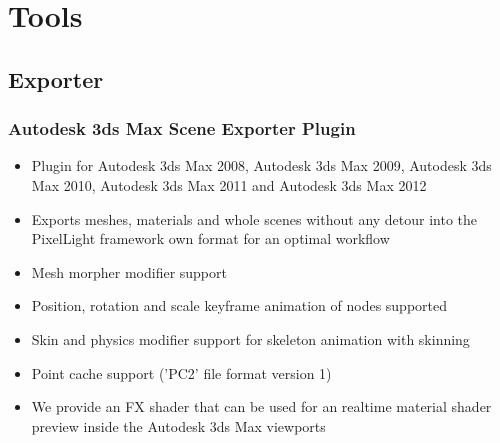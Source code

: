 \chapter{Tools}




\section{Exporter}


\subsection{Autodesk 3ds Max Scene Exporter Plugin}
\begin{itemize}
\item{Plugin for Autodesk 3ds Max 2008, Autodesk 3ds Max 2009, Autodesk 3ds Max 2010, Autodesk 3ds Max 2011 and Autodesk 3ds Max 2012}
\item{Exports meshes, materials and whole scenes without any detour into the PixelLight framework own format for an optimal workflow}
\item{Mesh morpher modifier support}
\item{Position, rotation and scale keyframe animation of nodes supported}
\item{Skin and physics modifier support for skeleton animation with skinning}
\item{Point cache support ('PC2' file format version 1)}
\item{We provide an FX shader that can be used for an realtime material shader preview inside the Autodesk 3ds Max viewports}
\end{itemize}
